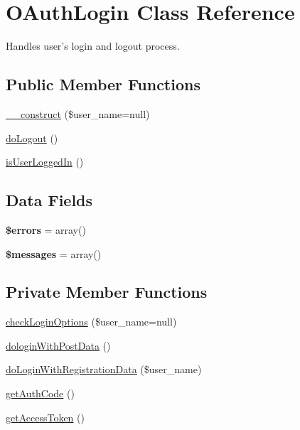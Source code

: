 \hypertarget{class_o_auth_login}{\section{\-O\-Auth\-Login \-Class \-Reference}
\label{class_o_auth_login}
}


\-Handles user's login and logout process.  


\subsection*{\-Public \-Member \-Functions}
\begin{DoxyCompactItemize}
\item 
\hyperlink{class_o_auth_login_a8b75ab7c2c6093a8bdc65aae845f94e3}{\-\_\-\-\_\-construct} (\$user\-\_\-name=null)
\item 
\hyperlink{class_o_auth_login_a293fa112652b5448b15c0fb81eafc7cb}{do\-Logout} ()
\item 
\hyperlink{class_o_auth_login_aeb08814a3b11252c66e465a868da3ea7}{is\-User\-Logged\-In} ()
\end{DoxyCompactItemize}
\subsection*{\-Data \-Fields}
\begin{DoxyCompactItemize}
\item 
\hypertarget{class_o_auth_login_ab24faf4aa647cdcee494fc48524ad4ff}{{\bfseries \$errors} = array()}\label{class_o_auth_login_ab24faf4aa647cdcee494fc48524ad4ff}

\item 
\hypertarget{class_o_auth_login_a21a183f927a6d243fe6b4ba3a6c4d4c8}{{\bfseries \$messages} = array()}\label{class_o_auth_login_a21a183f927a6d243fe6b4ba3a6c4d4c8}

\end{DoxyCompactItemize}
\subsection*{\-Private \-Member \-Functions}
\begin{DoxyCompactItemize}
\item 
\hyperlink{class_o_auth_login_a8322cf84e18446c243e58abb037768ff}{check\-Login\-Options} (\$user\-\_\-name=null)
\item 
\hyperlink{class_o_auth_login_aa004457f1cc98762661db58d7c773976}{dologin\-With\-Post\-Data} ()
\item 
\hyperlink{class_o_auth_login_a71b6b746976b1cd18dfc498108e18207}{do\-Login\-With\-Registration\-Data} (\$user\-\_\-name)
\item 
\hyperlink{class_o_auth_login_a51ba603198840f5de5e0c8836a85b5d7}{get\-Auth\-Code} ()
\item 
\hyperlink{class_o_auth_login_a5d251c70a3f9f9daaff7f00ec5f894c0}{get\-Access\-Token} ()
\end{DoxyCompactItemize}
